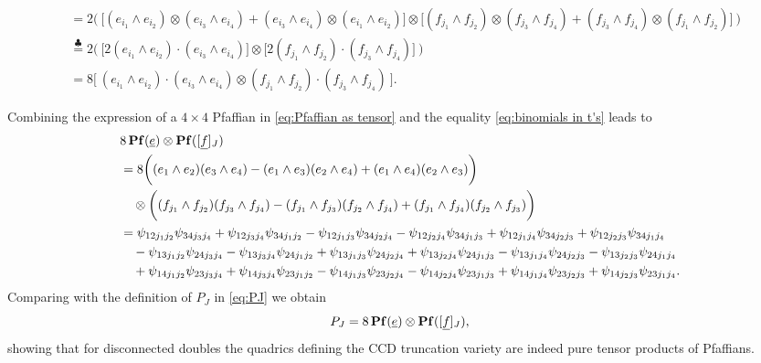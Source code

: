 \documentclass[11pt,reqno]{amsart}
\theoremstyle{definition}
\numberwithin{theorem}{section}
\DeclareMathOperator{\Pf}{\bf Pf}
\numberwithin{equation}{section}
\begin{document}
{\begin{align}
    & =  2\bigg( \ 
        \bigg[ (e_{i_1}\wedge e_{i_2}) \otimes (e_{i_3}\wedge e_{i_4}) +  (e_{i_3}\wedge e_{i_4}) \otimes (e_{i_1}\wedge e_{i_2}) \bigg] \otimes \bigg[ (f_{j_1}\wedge f_{j_2})\otimes (f_{j_3}\wedge f_{j_4}) + (f_{j_3}\wedge f_{j_4})\otimes (f_{j_1}\wedge f_{j_2}) \bigg] \ \bigg) \nonumber\\
    & \stackrel{\clubsuit}{=} 2\bigg( \ \bigg[ 2 (e_{i_1}\wedge e_{i_2}) \cdot (e_{i_3}\wedge e_{i_4}) \bigg] \otimes \bigg[ 2 (f_{j_1}\wedge f_{j_2})\cdot (f_{j_3}\wedge f_{j_4}) \bigg] \ \bigg) \nonumber\\
    & = 8 \big[ \ (e_{i_1}\wedge e_{i_2}) \cdot (e_{i_3}\wedge e_{i_4}) \otimes (f_{j_1}\wedge f_{j_2})\cdot (f_{j_3}\wedge f_{j_4}) \ \big] .
    \end{align}
    }

\noindent Combining the expression of a $4\times 4$ Pfaffian in \eqref{eq:Pfaffian as tensor} and the equality \eqref{eq:binomials in t's} leads to
{\footnotesize
\begin{align*}
& 8\Pf(\underline{e})\otimes \Pf([\underline{f}]_J) \nonumber \\
& = 8 \bigg( (e_{1}\wedge e_2)(e_3\wedge e_4) - (e_1\wedge e_3)(e_2\wedge e_4) + (e_1\wedge e_4)(e_2\wedge e_3) \bigg) \\
& \quad \otimes 
\bigg( (f_{j_1}\wedge f_{j_2})(f_{j_3}\wedge f_{j_4}) - (f_{j_1}\wedge f_{j_3})(f_{j_2}\wedge f_{j_4}) + (f_{j_1}\wedge f_{j_4})(f_{j_2}\wedge f_{j_3}) \bigg) \nonumber \\
& = \psi_{12j_1j_2}\psi_{34j_3j_4} + \psi_{12j_3j_4}\psi_{34j_1j_2} - \psi_{12j_1j_3}\psi_{34j_2j_4} - \psi_{12j_2j_4}\psi_{34j_1j_3} + \psi_{12j_1j_4}\psi_{34j_2j_3} + \psi_{12j_2j_3}\psi_{34j_1j_4} \nonumber \\
& \quad  - \psi_{13j_1j_2}\psi_{24j_3j_4} - \psi_{13j_3j_4}\psi_{24j_1j_2} + \psi_{13j_1j_3}\psi_{24j_2j_4} + \psi_{13j_2j_4}\psi_{24j_1j_3} - \psi_{13j_1j_4}\psi_{24j_2j_3} - \psi_{13j_2j_3}\psi_{24j_1j_4} \nonumber \\
& \quad + \psi_{14j_1j_2}\psi_{23j_3j_4} + \psi_{14j_3j_4}\psi_{23j_1j_2} - \psi_{14j_1j_3}\psi_{23j_2j_4} - \psi_{14j_2j_4}\psi_{23j_1j_3} + \psi_{14j_1j_4}\psi_{23j_2j_3} + \psi_{14j_2j_3}\psi_{23j_1j_4} .\nonumber 
\end{align*}
}
\noindent Comparing with the definition of $P_J$ in \eqref{eq:PJ} we obtain
\begin{equation*}\label{eq:PJ as Pfaffian}
P_J = 8\Pf(\underline{e})\otimes \Pf([\underline{f}]_J),
\end{equation*}
showing that for disconnected doubles the quadrics defining the CCD truncation variety are indeed pure tensor products of Pfaffians.
\end{document}
